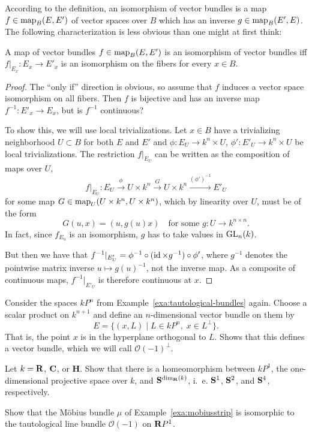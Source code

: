 \documentclass[a4paper,openany]{scrbook}
\begin{document}
According to the definition, an isomorphism of vector bundles is a map $f\in \map_B(E,E')$ of vector spaces over $B$ which has an inverse $g\in \map_B(E',E)$. The following characterization is less obvious than one might at first think:

\begin{thm} \label{thm:fiberwiseiso}
A map of vector bundles $f\in \map_B(E,E')$ is an isomorphism of vector bundles iff $f|_{E_x}\colon E_x \to E'_x$ is an isomorphism on the fibers for every $x \in B$.
\end{thm}
\begin{proof}
The “only if” direction is obvious, so assume that $f$ induces a vector space isomorphism on all fibers. Then $f$ is bijective and has an inverse map $f^{-1}\colon E'_x \to E_x$, but is $f^{-1}$ continuous?

To show this, we will use local trivializations. Let $x \in B$ have a trivializing neighborhood $U \subset B$ for both $E$ and $E'$ and $\phi\colon E_U \to k^n \times U$, $\phi'\colon E'_U \to k^n \times U$ be local trivializations. The restriction $f|_{E_U}$ can be written as the composition of maps over $U$,
\[
f|_{E_U}\colon E_U \xrightarrow{\phi} U \times k^n \xrightarrow{G} U \times k^n \xrightarrow{(\phi')^{-1}} E'_U
\]
for some map $G \in \map_U(U \times k^n,U \times k^n)$, which by linearity over $U$, must be of the form
\[
G(u,x) = (u,g(u)x) \quad \text{for some $g\colon U \to k^{n \times n}$}.
\]
In fact, since $f_{E_u}$ is an isomorphism, $g$ has to take values in $\GL_n(k)$.

But then we have that $f^{-1}|_{E'_U} = \phi^{-1} \circ (\id \times g^{-1}) \circ \phi'$, where $g^{-1}$ denotes the pointwise matrix inverse $u \mapsto g(u)^{-1}$, not the inverse map. As a composite of continuous maps, $f^{-1}|_{E'_U}$ is therefore continuous at $x$. 
\end{proof}

\begin{exer} \label{exer:complement-of-tautological-bundle}
Consider the spaces $kP^n$ from Example~\ref{exa:tautological-bundles} again. Choose a scalar product on $k^{n+1}$ and define an $n$-dimensional vector bundle on them by
\[
E = \{(x,L) \mid L \in kP^n,\; x \in L^\perp\}.
\]
That is, the point $x$ is in the hyperplane orthogonal to $L$. Shows that this defines a vector bundle, which we will call $\mathcal O(-1)^\perp$.
\end{exer}

\begin{exer} 
Let $k=\R$, $\CC$, or $\mathbf H$. Show that there is a homeomorphism between $kP^1$, the one-dimensional projective space over $k$, and $\S^{\dim_\R(k)}$, i.~e. $\S^1$, $\S^2$, and $\S^4$, respectively.

Show that the Möbius bundle $\mu$ of Example~\ref{exa:mobiusstrip} is isomorphic to the tautological line bundle $\mathcal O(-1)$ on $\R P^1$.
\end{exer}
\end{document}
